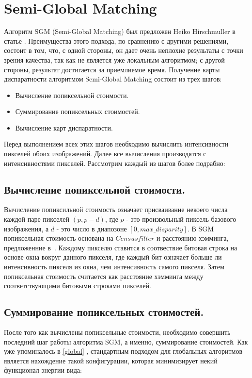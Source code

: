 \section{Semi-Global Matching}
\label{sgm}
Алгоритм SGM (Semi-Global Matching) был предложен Heiko Hirschmuller 
в статье \cite{sgm}. Преимущества этого подхода, по сравнению с другими решениями, состоит в
том, что, с одной стороны, он дает очень неплохие результаты с точки зрения качества, так
как не является уже локальным алгоритмом; с другой стороны, результат достигается за
приемлиемое время.
Получение карты диспаратности алгоритмом Semi-Global Matching состоит из трех
шагов:
\begin{itemize} 
\item Вычисление попиксельной стоимости.
\item Суммирование попиксельных стоимостей.
\item Вычисление карт диспаратности.
\end{itemize}
Перед выполнением всех этих шагов необходимо вычислить интенсивности пикселей
обоих изображений. Далее все вычисления производятся с интенсивностями пикселей.
Рассмотрим каждый из шагов более подрабно:

\subsection{Вычисление попиксельной стоимости.}
Вычисление попиксильной стоимость означает присваивание некоего числа каждой паре пикселей $(p, p - d)$, где $p$ - это произвольный пиксель базового изображения, а $d$ - это число в диапозоне $[ 0, max\_disparity]$. В SGM попиксельная стоимость основана на $Census filter$ и расстоянию хэмминга, предложенние в~\cite{census}. Каждому пикселю ставится в соотвествие битовая строка на основе окна вокруг данного пикселя, где каждый бит означает больше ли интенсивность пикселя из окна, чем интенсивность самого пикселя. Затем попиксельная стоимость считается как расстояние хэмминга между соответствующими битовыми строками пикселей. 

\subsection{Суммирование попиксельных стоимостей.}
После того как вычислены попиксельные стоимости, необходимо совершить
последний шаг работы алгоритма SGM, а именно, суммирование стоимостей. Как уже
упоминалось в \ref{global} , стандартным подходом для глобальных алгоритмов является нахождение
такой конфигурации, которая минимизирует некий функционал энергии вида: 

